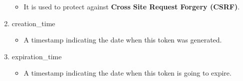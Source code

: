 \documentclass[letterpaper,10pt,english]{sphinxmanual}
\begin{document}
\begin{enumerate}
\begin{itemize}
\item {} 
It is used to protect against \textbf{Cross Site Request Forgery (CSRF)}.

\end{itemize}

\item {} 
creation\_time
\begin{itemize}
\item {} 
A timestamp indicating the date when this token was generated.

\end{itemize}

\item {} 
expiration\_time
\begin{itemize}
\item {} 
A timestamp indicating the date when this token is going to expire.

\end{itemize}

\end{enumerate}
\end{document}
